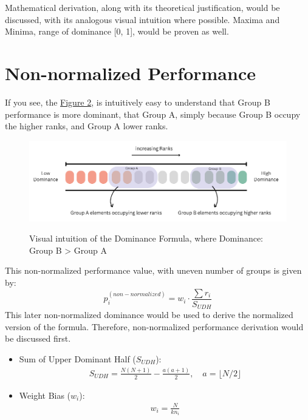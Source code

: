 \documentclass[man,floatsintext]{apa7}
\begin{document}
\hfill \break
Mathematical derivation, along with its theoretical justification, would be discussed, with its analogous visual intuition where possible. Maxima and Minima, range of dominance [0, 1], would be proven as well.

\section{Non-normalized Performance}

If you see, the \hyperref[fig:dominance_Understanding]{Figure 2}, is intuitively easy to understand that Group B performance is more dominant, that Group A, simply because Group B occupy the higher ranks, and Group A lower ranks.
\begin{figure}[!htb]
    \caption{Visual intuition of the Dominance Formula, where Dominance: Group B > Group A}
    \centering
    \includegraphics[scale=0.65]{images/dominance-intuition.png}
    \label{fig:dominance_Understanding}
\end{figure}

This non-normalized performance value, with uneven number of groups is given by:
\begin{equation}
\label{eq:non-normalized}
    p_i^{(non-normalized)} = w_i \cdot \frac{\sum r_i}{ S_{UDH} }
\end{equation}
This later non-normalized dominance would be used to derive the normalized version of the formula. Therefore, non-normalized performance derivation would be discussed first.

\begin{itemize}
    \item Sum of Upper Dominant Half ($S_{UDH}$):
    \begin{align}
        S_{UDH} = \frac{N(N+1)}{2} - \frac{a(a+1)}{2}, \quad a = \lfloor N/2 \rfloor
    \end{align}
    \item Weight Bias ($w_i$):
    \begin{align}
        w_i = \frac{N}{k n_i}
    \end{align}
\end{itemize}
\end{document}
